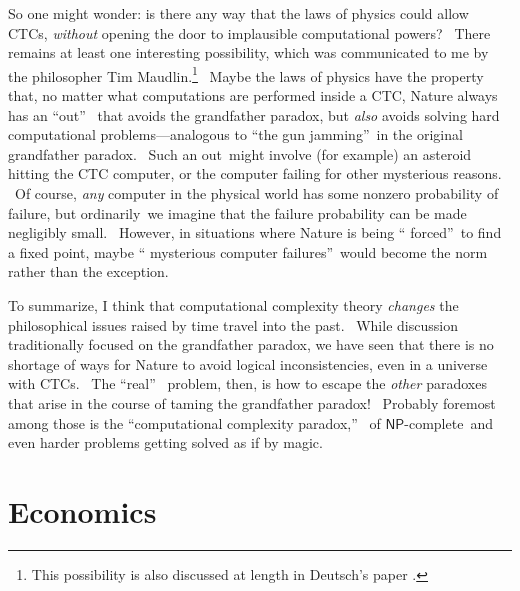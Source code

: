 \documentclass[12pt,onecolumn]{article}%
\begin{document}
So one might wonder: is there any way that the laws of physics could allow
CTCs, \textit{without} opening the door to implausible computational powers?
\ There remains at least one interesting possibility, which was communicated
to me by the philosopher Tim Maudlin.\footnote{This possibility is also
discussed at length in Deutsch's paper \cite{deutsch:ctc}.} \ Maybe the laws
of physics have the property that, no matter what computations are performed
inside a CTC, Nature always has an \textquotedblleft out\textquotedblright%
\ that avoids the grandfather paradox, but \textit{also} avoids solving hard
computational problems---analogous to \textquotedblleft the gun
jamming\textquotedblright\ in the original grandfather paradox. \ Such an
out\ might involve (for example) an asteroid hitting the CTC computer, or the
computer failing for other mysterious reasons. \ Of course, \textit{any}
computer in the physical world has some nonzero probability of failure, but
ordinarily\ we imagine that the failure probability can be made negligibly
small. \ However, in situations where Nature is being \textquotedblleft
forced\textquotedblright\ to find a fixed point, maybe \textquotedblleft
mysterious computer failures\textquotedblright\ would become the norm rather
than the exception.

To summarize, I think that computational complexity theory \textit{changes}
the philosophical issues raised by time travel into the past. \ While
discussion traditionally focused on the grandfather paradox, we have seen that
there is no shortage of ways for Nature to avoid logical inconsistencies, even
in a universe with CTCs. \ The \textquotedblleft real\textquotedblright%
\ problem, then, is how to escape the \textit{other} paradoxes that arise in
the course of taming the grandfather paradox! \ Probably foremost among those
is the \textquotedblleft computational complexity paradox,\textquotedblright%
\ of $\mathsf{NP}$-complete\ and even harder problems getting solved as if by magic.

\section{Economics\label{ECON}}
\end{document}
